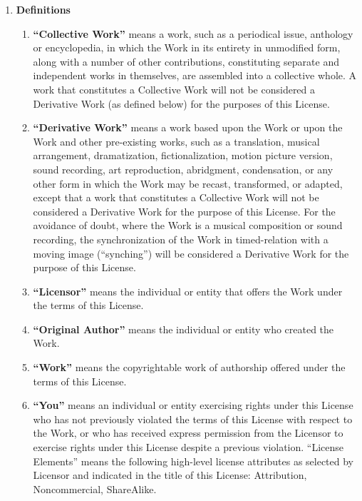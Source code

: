 \medbreak
\begin{enumerate}
\item \textbf{Definitions}

\begin{enumerate}
\item \textbf{``Collective Work''} means a work, such as a periodical
issue, anthology or encyclopedia, in which the Work in its entirety in
unmodified form, along with a number of other contributions,
constituting separate and independent works in themselves, are
assembled into a collective whole. A work that constitutes a
Collective Work will not be considered a Derivative Work (as defined
below) for the purposes of this License.

\item \textbf{``Derivative Work''} means a work based upon the Work or
upon the Work and other pre-existing works, such as a translation,
musical arrangement, dramatization, fictionalization, motion picture
version, sound recording, art reproduction, abridgment, condensation,
or any other form in which the Work may be recast, transformed, or
adapted, except that a work that constitutes a Collective Work will
not be considered a Derivative Work for the purpose of this
License. For the avoidance of doubt, where the Work is a musical
composition or sound recording, the synchronization of the Work in
timed-relation with a moving image (``synching'') will be considered a
Derivative Work for the purpose of this License.

\item \textbf{``Licensor''} means the individual or entity that offers
the Work under the terms of this License.

\item \textbf{``Original Author''} means the individual or entity who
created the Work.

\item \textbf{``Work''} means the copyrightable work of authorship
offered under the terms of this License.

\item \textbf{``You''} means an individual or entity exercising rights
under this License who has not previously violated the terms of this
License with respect to the Work, or who has received express
permission from the Licensor to exercise rights under this License
despite a previous violation.  ``License Elements'' means the following
high-level license attributes as selected by Licensor and indicated in
the title of this License: Attribution, Noncommercial, ShareAlike.
\end{enumerate}


\end{enumerate}
